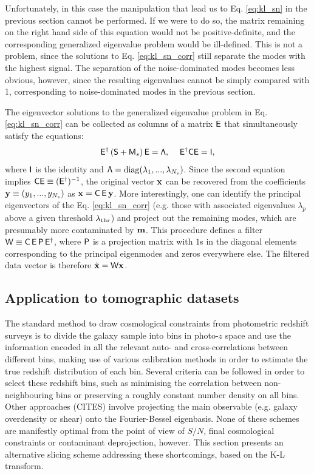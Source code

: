 \documentclass[twocolumn,amsfont,amssymb,amsmath, showpacs,balancelastpage, nofootinbib]{revtex4-1}
\begin{document}
      Unfortunately, in this case the manipulation that lead us to Eq. \ref{eq:kl_sn} in the previous section cannot be performed. If we were to do so, the matrix remaining on the right hand side of this equation would not be positive-definite, and the corresponding generalized eigenvalue problem would be ill-defined. This is not a problem, since the solutions to Eq. \ref{eq:kl_sn_corr} still separate the modes with the highest signal. The separation of the noise-dominated modes becomes less obvious, however, since the resulting eigenvalues cannot be simply compared with 1, corresponding to noise-dominated modes in the previous section.
      
      The eigenvector solutions to the generalized eigenvalue problem in Eq. \ref{eq:kl_sn_corr} can be collected as columns of a matrix ${\sf E}$ that simultaneously satisfy the equations:
      \begin{equation}
        {\sf E}^\dag\left({\sf S}+{\sf M}_s\right){\sf E}={\sf \Lambda},
        \hspace{12pt}
        {\sf E}^\dag{\sf C}{\sf E}={\sf I},
      \end{equation}
      where ${\sf I}$ is the identity and ${\sf \Lambda}={\rm diag}(\lambda_1,...,\lambda_{N_s})$.
      Since the second equation implies ${\sf C}{\sf E}\equiv({\sf E}^\dag)^{-1}$, the original vector ${\bf x}$ can be recovered from the coefficients ${\bf y}\equiv(y_1,...,y_{N_s})$ as ${\bf x}={\sf C}\,{\sf E}\,{\bf y}$. More interestingly, one can identify the principal eigenvectors of the Eq. \ref{eq:kl_sn_corr} (e.g. those with associated eigenvalues $\lambda_p$ above a given threshold $\lambda_{\rm thr}$) and project out the remaining modes, which are presumably more contaminated by ${\bf m}$. This procedure defines a filter ${\sf W}\equiv{\sf C}\,{\sf E}\,{\sf P}\,{\sf E}^\dag$, where ${\sf P}$ is a projection matrix with $1$s in the diagonal elements corresponding to the principal eigenmodes and zeros everywhere else. The filtered data vector is therefore $\tilde{\bf x}={\sf W}{\bf x}$.

  \subsection{Application to tomographic datasets}\label{ssec:method.tomographic}
    The standard method to draw cosmological constraints from photometric redshift surveys is to divide the galaxy sample into bins in photo-$z$ space and use the information encoded in all the relevant auto- and cross-correlations between different bins, making use of various calibration methods in order to estimate the true redshift distribution of each bin. Several criteria can be followed in order to select these redshift bins, such as minimising the correlation between non-neighbouring bins or preserving a roughly constant number density on all bins. Other approaches (CITES) involve projecting the main observable (e.g. galaxy overdensity or shear) onto the Fourier-Bessel eigenbasis. None of these schemes are manifestly optimal from the point of view of $S/N$, final cosmological constraints or contaminant deprojection, however. This section presents an alternative slicing scheme addressing these shortcomings, based on the K-L transform.
    
\end{document}
